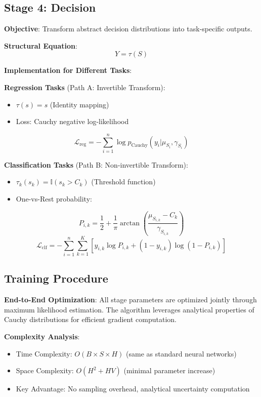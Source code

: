 \documentclass[conference]{IEEEtran}
\newcommand{\cauchy}{\text{Cauchy}}
\newcommand{\indicator}{\mathbb{I}}
\begin{document}
\subsection{Stage 4: Decision}

\textbf{Objective}: Transform abstract decision distributions into task-specific outputs.

\textbf{Structural Equation}:
\begin{equation}
Y = \tau(S)
\end{equation}

\textbf{Implementation for Different Tasks}:

\textbf{Regression Tasks} (Path A: Invertible Transform):
\begin{itemize}
\item $\tau(s) = s$ (Identity mapping)
\item Loss: Cauchy negative log-likelihood
\end{itemize}
\begin{equation}
\mathcal{L}_{\text{reg}} = -\sum_{i=1}^n \log p_{\cauchy}(y_i | \mu_{S_i}, \gamma_{S_i})
\end{equation}

\textbf{Classification Tasks} (Path B: Non-invertible Transform):
\begin{itemize}
\item $\tau_k(s_k) = \indicator(s_k > C_k)$ (Threshold function)  
\item One-vs-Rest probability:
\end{itemize}
\begin{equation}
P_{i,k} = \frac{1}{2} + \frac{1}{\pi} \arctan\left(\frac{\mu_{S_{i,k}} - C_k}{\gamma_{S_{i,k}}}\right)
\end{equation}
\begin{equation}
\mathcal{L}_{\text{clf}} = -\sum_{i=1}^n \sum_{k=1}^K [y_{i,k} \log P_{i,k} + (1-y_{i,k}) \log(1-P_{i,k})]
\end{equation}

\subsection{Training Procedure}

\textbf{End-to-End Optimization}: All stage parameters are optimized jointly through maximum likelihood estimation. The algorithm leverages analytical properties of Cauchy distributions for efficient gradient computation.

\textbf{Complexity Analysis}:
\begin{itemize}
\item Time Complexity: $O(B \times S \times H)$ (same as standard neural networks)
\item Space Complexity: $O(H^2 + HV)$ (minimal parameter increase)
\item Key Advantage: No sampling overhead, analytical uncertainty computation
\end{itemize}
\end{document}
